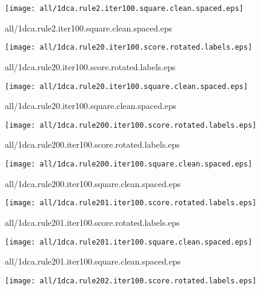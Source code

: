 \documentclass{article}
\begin{document}
\begin{center}
\begin{minipage}{\textwidth}
\texttt{[image: all/1dca.rule2.iter100.square.clean.spaced.eps]}
\end{minipage}
\end{center}
{\footnotesize all/1dca.rule2.iter100.square.clean.spaced.eps}
\begin{center}
\begin{minipage}{\textwidth}
\texttt{[image: all/1dca.rule20.iter100.score.rotated.labels.eps]}
\end{minipage}
\end{center}
{\footnotesize all/1dca.rule20.iter100.score.rotated.labels.eps}
\begin{center}
\begin{minipage}{\textwidth}
\texttt{[image: all/1dca.rule20.iter100.square.clean.spaced.eps]}
\end{minipage}
\end{center}
{\footnotesize all/1dca.rule20.iter100.square.clean.spaced.eps}
\begin{center}
\begin{minipage}{\textwidth}
\texttt{[image: all/1dca.rule200.iter100.score.rotated.labels.eps]}
\end{minipage}
\end{center}
{\footnotesize all/1dca.rule200.iter100.score.rotated.labels.eps}
\begin{center}
\begin{minipage}{\textwidth}
\texttt{[image: all/1dca.rule200.iter100.square.clean.spaced.eps]}
\end{minipage}
\end{center}
{\footnotesize all/1dca.rule200.iter100.square.clean.spaced.eps}
\begin{center}
\begin{minipage}{\textwidth}
\texttt{[image: all/1dca.rule201.iter100.score.rotated.labels.eps]}
\end{minipage}
\end{center}
{\footnotesize all/1dca.rule201.iter100.score.rotated.labels.eps}
\begin{center}
\begin{minipage}{\textwidth}
\texttt{[image: all/1dca.rule201.iter100.square.clean.spaced.eps]}
\end{minipage}
\end{center}
{\footnotesize all/1dca.rule201.iter100.square.clean.spaced.eps}
\begin{center}
\begin{minipage}{\textwidth}
\texttt{[image: all/1dca.rule202.iter100.score.rotated.labels.eps]}
\end{minipage}
\end{center}
\end{document}
